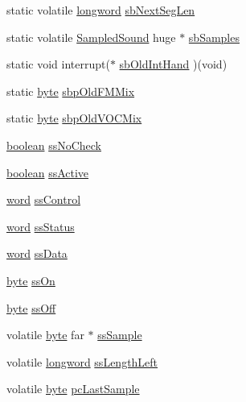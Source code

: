 \begin{DoxyCompactItemize}
\item 
static volatile \hyperlink{ID__HEAD_8H_a8a9a7dd50c6fdb45dcdf0eb929479663}{longword} \hyperlink{ID__SD_8C_afaf42553cd16229e97ca17918ed5c7e0}{sbNextSegLen}
\item 
static volatile \hyperlink{structSampledSound}{SampledSound} huge $\ast$ \hyperlink{ID__SD_8C_a350869bbfe2aab6254a38474d4944661}{sbSamples}
\item 
static void interrupt($\ast$ \hyperlink{ID__SD_8C_a3e33d5500965a04a9c3c1cf959efa39b}{sbOldIntHand} )(void)
\item 
static \hyperlink{ID__HEAD_8H_a0c8186d9b9b7880309c27230bbb5e69d}{byte} \hyperlink{ID__SD_8C_a47faa268b0b9910d4994c5f04707b1a6}{sbpOldFMMix}
\item 
static \hyperlink{ID__HEAD_8H_a0c8186d9b9b7880309c27230bbb5e69d}{byte} \hyperlink{ID__SD_8C_a9aab7ab61356ba1e14b8f49097650810}{sbpOldVOCMix}
\item 
\hyperlink{ID__HEAD_8H_a7c6368b321bd9acd0149b030bb8275ed}{boolean} \hyperlink{ID__SD_8C_a837aafc6fb5d5f9c711933cbc25c0c8f}{ssNoCheck}
\item 
\hyperlink{ID__HEAD_8H_a7c6368b321bd9acd0149b030bb8275ed}{boolean} \hyperlink{ID__SD_8C_ab6c0b8a3c16c52edb3fdce3ef94637fb}{ssActive}
\item 
\hyperlink{ID__HEAD_8H_abad51e07ab6d26bec9f1f786c8d65bcd}{word} \hyperlink{ID__SD_8C_ac50582571050ee8c37353e94c9c8537c}{ssControl}
\item 
\hyperlink{ID__HEAD_8H_abad51e07ab6d26bec9f1f786c8d65bcd}{word} \hyperlink{ID__SD_8C_a21fe4e545446608d7a38a59f55de6c40}{ssStatus}
\item 
\hyperlink{ID__HEAD_8H_abad51e07ab6d26bec9f1f786c8d65bcd}{word} \hyperlink{ID__SD_8C_ab9aec2326df131568a1bb337ed215323}{ssData}
\item 
\hyperlink{ID__HEAD_8H_a0c8186d9b9b7880309c27230bbb5e69d}{byte} \hyperlink{ID__SD_8C_a6fe70bd7705926047ee7bb735fd9d51a}{ssOn}
\item 
\hyperlink{ID__HEAD_8H_a0c8186d9b9b7880309c27230bbb5e69d}{byte} \hyperlink{ID__SD_8C_abd66f785699aa96dd9224fd0a9cff9ee}{ssOff}
\item 
volatile \hyperlink{ID__HEAD_8H_a0c8186d9b9b7880309c27230bbb5e69d}{byte} far $\ast$ \hyperlink{ID__SD_8C_a8cf5075d58538ca559769c25a0e0415f}{ssSample}
\item 
volatile \hyperlink{ID__HEAD_8H_a8a9a7dd50c6fdb45dcdf0eb929479663}{longword} \hyperlink{ID__SD_8C_ae32ab0caf3dd74e04df22f5082bba2f5}{ssLengthLeft}
\item 
volatile \hyperlink{ID__HEAD_8H_a0c8186d9b9b7880309c27230bbb5e69d}{byte} \hyperlink{ID__SD_8C_ae1039a6b232e32369a231bb2031bfe69}{pcLastSample}

\end{DoxyCompactItemize}
